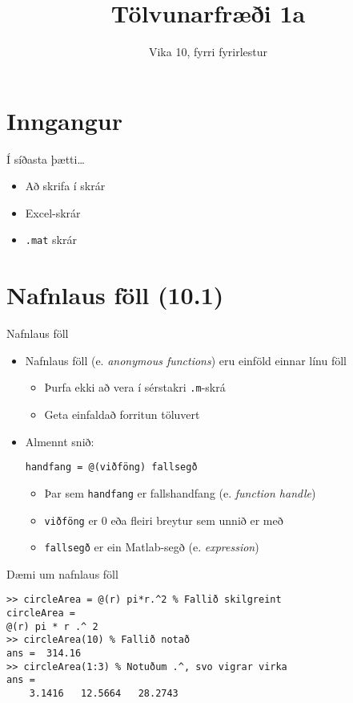 \documentclass[handout]{beamer}
\title{Tölvunarfræði 1a}
\subtitle{Vika 10, fyrri fyrirlestur}
\begin{document}
\begin{frame}
\titlepage
\end{frame}

\section{Inngangur}

\begin{frame}{Í síðasta þætti\ldots}
    \begin{itemize}
        \item Að skrifa í skrár
        \item Excel-skrár
        \item \texttt{.mat} skrár
    \end{itemize}
\end{frame}

\section{Nafnlaus föll (10.1)}

\begin{frame}[fragile]{Nafnlaus föll}
\begin{itemize}
 \item Nafnlaus föll (e. \emph{anonymous functions}) eru einföld einnar línu föll
 \begin{itemize}
  \item Þurfa ekki að vera í sérstakri \texttt{.m}-skrá
  \item Geta einfaldað forritun töluvert
 \end{itemize}
 \item Almennt snið:
\begin{verbatim}
handfang = @(viðföng) fallsegð
\end{verbatim}
 \begin{itemize}
  \item Þar sem \texttt{handfang} er fallshandfang (e. \emph{function handle})
  \item \texttt{viðföng} er 0 eða fleiri breytur sem unnið er með
  \item \texttt{fallsegð} er ein Matlab-segð (e. \emph{expression})
 \end{itemize}
\end{itemize}
\end{frame}

\begin{frame}[fragile]{Dæmi um nafnlaus föll}
\begin{verbatim}
>> circleArea = @(r) pi*r.^2 % Fallið skilgreint
circleArea =
@(r) pi * r .^ 2
>> circleArea(10) % Fallið notað
ans =  314.16
>> circleArea(1:3) % Notuðum .^, svo vigrar virka
ans =
    3.1416   12.5664   28.2743
\end{verbatim}
\end{frame}
\end{document}
